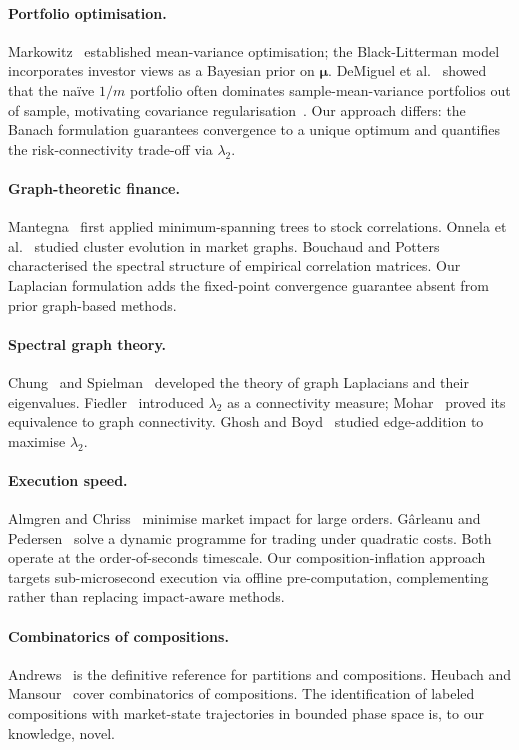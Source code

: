 \documentclass[twocolumn,11pt,a4paper]{article}
\theoremstyle{remark}
\newcommand{\bmu}{\bm{\mu}}
\newcommand{\lam}[1]{\lambda_{#1}}
\begin{document}
\paragraph{Portfolio optimisation.}
Markowitz~\cite{markowitz1952} established mean-variance optimisation;
the Black-Litterman model~\cite{black1991} incorporates investor views as
a Bayesian prior on $\bmu$.
DeMiguel et al.~\cite{demiguel2009} showed that the na\"ive $1/m$ portfolio
often dominates sample-mean-variance portfolios out of sample, motivating
covariance regularisation~\cite{ledoit2004}.
Our approach differs: the Banach formulation guarantees convergence to a unique
optimum and quantifies the risk-connectivity trade-off via $\lam{2}$.

\paragraph{Graph-theoretic finance.}
Mantegna~\cite{mantegna1999} first applied minimum-spanning trees to stock correlations.
Onnela et al.~\cite{onnela2003} studied cluster evolution in market graphs.
Bouchaud and Potters~\cite{bouchaud2003} characterised the spectral structure of
empirical correlation matrices. Our Laplacian formulation adds the fixed-point
convergence guarantee absent from prior graph-based methods.

\paragraph{Spectral graph theory.}
Chung~\cite{chung1997} and Spielman~\cite{spielman2012} developed the theory of
graph Laplacians and their eigenvalues.
Fiedler~\cite{fiedler1973} introduced $\lam{2}$ as a connectivity measure;
Mohar~\cite{mohar1991} proved its equivalence to graph connectivity.
Ghosh and Boyd~\cite{ghosh2006} studied edge-addition to maximise $\lam{2}$.

\paragraph{Execution speed.}
Almgren and Chriss~\cite{almgren2001} minimise market impact for large orders.
Gârleanu and Pedersen~\cite{garleanu2013} solve a dynamic programme for
trading under quadratic costs. Both operate at the order-of-seconds timescale.
Our composition-inflation approach targets sub-microsecond execution via
offline pre-computation, complementing rather than replacing impact-aware methods.

\paragraph{Combinatorics of compositions.}
Andrews~\cite{andrews1976} is the definitive reference for partitions and compositions.
Heubach and Mansour~\cite{heubach2009} cover combinatorics of compositions.
The identification of labeled compositions with market-state trajectories in
bounded phase space is, to our knowledge, novel.
\end{document}

